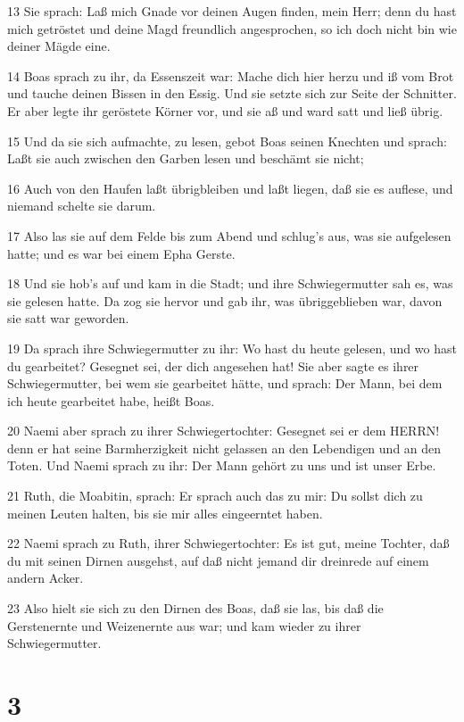 \par 13 Sie sprach: Laß mich Gnade vor deinen Augen finden, mein Herr; denn du hast mich getröstet und deine Magd freundlich angesprochen, so ich doch nicht bin wie deiner Mägde eine.
\par 14 Boas sprach zu ihr, da Essenszeit war: Mache dich hier herzu und iß vom Brot und tauche deinen Bissen in den Essig. Und sie setzte sich zur Seite der Schnitter. Er aber legte ihr geröstete Körner vor, und sie aß und ward satt und ließ übrig.
\par 15 Und da sie sich aufmachte, zu lesen, gebot Boas seinen Knechten und sprach: Laßt sie auch zwischen den Garben lesen und beschämt sie nicht;
\par 16 Auch von den Haufen laßt übrigbleiben und laßt liegen, daß sie es auflese, und niemand schelte sie darum.
\par 17 Also las sie auf dem Felde bis zum Abend und schlug's aus, was sie aufgelesen hatte; und es war bei einem Epha Gerste.
\par 18 Und sie hob's auf und kam in die Stadt; und ihre Schwiegermutter sah es, was sie gelesen hatte. Da zog sie hervor und gab ihr, was übriggeblieben war, davon sie satt war geworden.
\par 19 Da sprach ihre Schwiegermutter zu ihr: Wo hast du heute gelesen, und wo hast du gearbeitet? Gesegnet sei, der dich angesehen hat! Sie aber sagte es ihrer Schwiegermutter, bei wem sie gearbeitet hätte, und sprach: Der Mann, bei dem ich heute gearbeitet habe, heißt Boas.
\par 20 Naemi aber sprach zu ihrer Schwiegertochter: Gesegnet sei er dem HERRN! denn er hat seine Barmherzigkeit nicht gelassen an den Lebendigen und an den Toten. Und Naemi sprach zu ihr: Der Mann gehört zu uns und ist unser Erbe.
\par 21 Ruth, die Moabitin, sprach: Er sprach auch das zu mir: Du sollst dich zu meinen Leuten halten, bis sie mir alles eingeerntet haben.
\par 22 Naemi sprach zu Ruth, ihrer Schwiegertochter: Es ist gut, meine Tochter, daß du mit seinen Dirnen ausgehst, auf daß nicht jemand dir dreinrede auf einem andern Acker.
\par 23 Also hielt sie sich zu den Dirnen des Boas, daß sie las, bis daß die Gerstenernte und Weizenernte aus war; und kam wieder zu ihrer Schwiegermutter.

\chapter{3}


